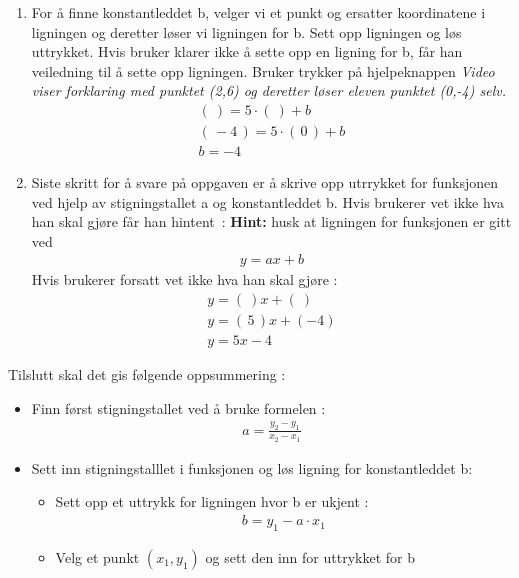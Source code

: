 \documentclass[12pt,twoside,onecolumn]{article}
\begin{document}
\begin{Exercise}
\begin{enumerate}
\item For å finne konstantleddet b, velger vi et punkt og ersatter koordinatene i ligningen og deretter løser vi ligningen for b. Sett opp ligningen og løs uttrykket.
{\color{Maroon} Hvis bruker klarer ikke å sette opp en ligning for b, får han veiledning til å sette opp ligningen. Bruker trykker på hjelpeknappen}
{\color{gray}\emph{Video viser forklaring med punktet (2,6) og deretter løser eleven punktet (0,-4) selv.} }
\begin{align}
(\:) = 5\cdot(\:) + b\\
(\, -4 \, ) = 5\cdot (\, 0 \, ) + b \\
b = -4
\end{align}

\item Siste skritt for å svare på oppgaven er å skrive opp utrrykket for funksjonen ved hjelp av stigningstallet a og konstantleddet b.
{\color{Maroon}
Hvis brukerer vet ikke hva han skal gjøre får han \mbox{hintent :}} \newline
\textbf{Hint:} husk at ligningen for funksjonen er gitt ved 
\begin{align}
y = ax + b
\end{align}
{\color{Maroon}
Hvis brukerer forsatt vet ikke hva han skal gjøre :}
\begin{align}
y = (\:)x + (\:)\\
y = (\, 5 \, )x  + (-4 )  \\
y = 5x - 4
\end{align}
\end{enumerate}

{\color{Maroon}Tilslutt skal det gis følgende oppsummering :}
\begin{itemize}
\item Finn først stigningstallet ved å bruke formelen :
\begin{align}
a =  \frac{y_2 - y_1}{x_2 - x_1}
\end{align}
\item Sett inn stigningstalllet i funksjonen og løs ligning for konstantleddet b:
\begin{itemize}
\item Sett opp et uttrykk for ligningen hvor b er ukjent :
\begin{align}
b = y_1 - a\cdot x_1
\end{align}
\item Velg et punkt $(x_1, y_1)$ og sett den inn for uttrykket for b
\end{itemize}
\end{itemize}
\end{Exercise}
\end{document}
